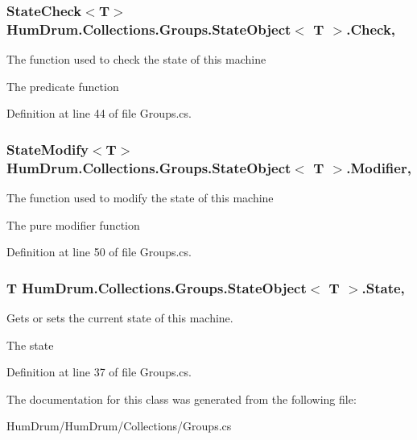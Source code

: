 \subsubsection[{Check}]{\setlength{\rightskip}{0pt plus 5cm}State\+Check$<$T$>$ {\bf Hum\+Drum.\+Collections.\+Groups.\+State\+Object}$<$ T $>$.Check\hspace{0.3cm}{\ttfamily [get]}, {\ttfamily [set]}}\label{classHumDrum_1_1Collections_1_1Groups_1_1StateObject_aca3a9433c50c52f7364d5239d3847749}


The function used to check the state of this machine 

The predicate function

Definition at line 44 of file Groups.\+cs.

\hypertarget{classHumDrum_1_1Collections_1_1Groups_1_1StateObject_a0d961b56d3c86f24a5185cb1812285ac}{}
\subsubsection[{Modifier}]{\setlength{\rightskip}{0pt plus 5cm}State\+Modify$<$T$>$ {\bf Hum\+Drum.\+Collections.\+Groups.\+State\+Object}$<$ T $>$.Modifier\hspace{0.3cm}{\ttfamily [get]}, {\ttfamily [set]}}\label{classHumDrum_1_1Collections_1_1Groups_1_1StateObject_a0d961b56d3c86f24a5185cb1812285ac}


The function used to modify the state of this machine 

The pure modifier function

Definition at line 50 of file Groups.\+cs.

\hypertarget{classHumDrum_1_1Collections_1_1Groups_1_1StateObject_a192fdeea48e27612063d5099456ec217}{}
\subsubsection[{State}]{\setlength{\rightskip}{0pt plus 5cm}T {\bf Hum\+Drum.\+Collections.\+Groups.\+State\+Object}$<$ T $>$.State\hspace{0.3cm}{\ttfamily [get]}, {\ttfamily [set]}}\label{classHumDrum_1_1Collections_1_1Groups_1_1StateObject_a192fdeea48e27612063d5099456ec217}


Gets or sets the current state of this machine. 

The state

Definition at line 37 of file Groups.\+cs.



The documentation for this class was generated from the following file\+:\begin{DoxyCompactItemize}
\item 
Hum\+Drum/\+Hum\+Drum/\+Collections/Groups.\+cs\end{DoxyCompactItemize}
